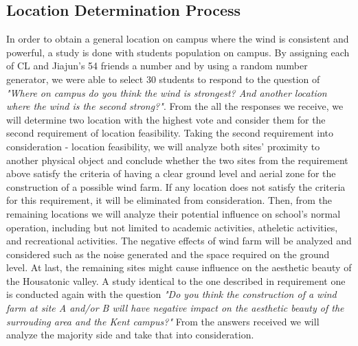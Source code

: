 \documentclass[review]{elsarticle}
\begin{document}
\subsection{Location Determination Process}
\label{sec:methods:locdeterprocess}
In order to obtain a general location on campus where the wind is consistent and powerful, a study is done with students population on campus. By assigning each of CL and 
Jiajun's 54 friends a number and by using a random number generator, we were able to select 30 students to respond to the question of 
\textit{"Where on campus do you think the wind is strongest? And another location where the wind is the second strong?"}. From the all the responses we receive, we will 
determine two location with the highest vote and consider them for the second requirement of location feasibility. Taking the second requirement into consideration - location feasibility, 
we will analyze both sites' proximity to another physical object and conclude whether the two 
 sites from the requirement above satisfy the criteria of having a clear ground level and aerial zone for the construction of a possible wind farm. If any location does 
 not satisfy the criteria for this requirement, it will be eliminated from consideration. Then, from the remaining locations we will analyze their potential influence 
 on school's normal operation, including but not limited to academic activities, atheletic activities, and recreational activities. The negative effects of wind farm will 
 be analyzed and considered such as the noise generated and the space required on the ground level. At last, the remaining sites might cause influence on the aesthetic beauty 
 of the Housatonic valley. A study identical to the one described in requirement one is conducted again with the question \textit{"Do you think the construction of a wind 
 farm at site A and/or B will have negative impact on the aesthetic beauty of the surrouding area and the Kent campus?"} From the answers received we will analyze the 
 majority side and take that into consideration. 
\end{document}
